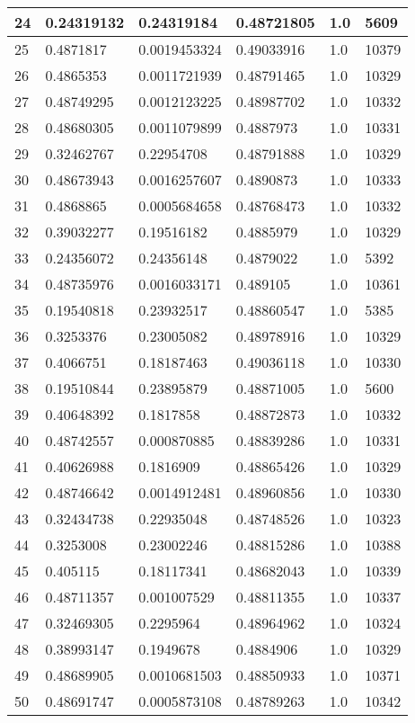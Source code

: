 \begin{longtable}{|l|l|l|l|l|l|}
24 & 0.24319132 & 0.24319184 & 0.48721805 & 1.0 & 5609 \\ \hline 
25 & 0.4871817 & 0.0019453324 & 0.49033916 & 1.0 & 10379 \\ \hline 
26 & 0.4865353 & 0.0011721939 & 0.48791465 & 1.0 & 10329 \\ \hline 
27 & 0.48749295 & 0.0012123225 & 0.48987702 & 1.0 & 10332 \\ \hline 
28 & 0.48680305 & 0.0011079899 & 0.4887973 & 1.0 & 10331 \\ \hline 
29 & 0.32462767 & 0.22954708 & 0.48791888 & 1.0 & 10329 \\ \hline 
30 & 0.48673943 & 0.0016257607 & 0.4890873 & 1.0 & 10333 \\ \hline 
31 & 0.4868865 & 0.0005684658 & 0.48768473 & 1.0 & 10332 \\ \hline 
32 & 0.39032277 & 0.19516182 & 0.4885979 & 1.0 & 10329 \\ \hline 
33 & 0.24356072 & 0.24356148 & 0.4879022 & 1.0 & 5392 \\ \hline 
34 & 0.48735976 & 0.0016033171 & 0.489105 & 1.0 & 10361 \\ \hline 
35 & 0.19540818 & 0.23932517 & 0.48860547 & 1.0 & 5385 \\ \hline 
36 & 0.3253376 & 0.23005082 & 0.48978916 & 1.0 & 10329 \\ \hline 
37 & 0.4066751 & 0.18187463 & 0.49036118 & 1.0 & 10330 \\ \hline 
38 & 0.19510844 & 0.23895879 & 0.48871005 & 1.0 & 5600 \\ \hline 
39 & 0.40648392 & 0.1817858 & 0.48872873 & 1.0 & 10332 \\ \hline 
40 & 0.48742557 & 0.000870885 & 0.48839286 & 1.0 & 10331 \\ \hline 
41 & 0.40626988 & 0.1816909 & 0.48865426 & 1.0 & 10329 \\ \hline 
42 & 0.48746642 & 0.0014912481 & 0.48960856 & 1.0 & 10330 \\ \hline 
43 & 0.32434738 & 0.22935048 & 0.48748526 & 1.0 & 10323 \\ \hline 
44 & 0.3253008 & 0.23002246 & 0.48815286 & 1.0 & 10388 \\ \hline 
45 & 0.405115 & 0.18117341 & 0.48682043 & 1.0 & 10339 \\ \hline 
46 & 0.48711357 & 0.001007529 & 0.48811355 & 1.0 & 10337 \\ \hline 
47 & 0.32469305 & 0.2295964 & 0.48964962 & 1.0 & 10324 \\ \hline 
48 & 0.38993147 & 0.1949678 & 0.4884906 & 1.0 & 10329 \\ \hline 
49 & 0.48689905 & 0.0010681503 & 0.48850933 & 1.0 & 10371 \\ \hline 
50 & 0.48691747 & 0.0005873108 & 0.48789263 & 1.0 & 10342 \\ \hline 
\end{longtable}
